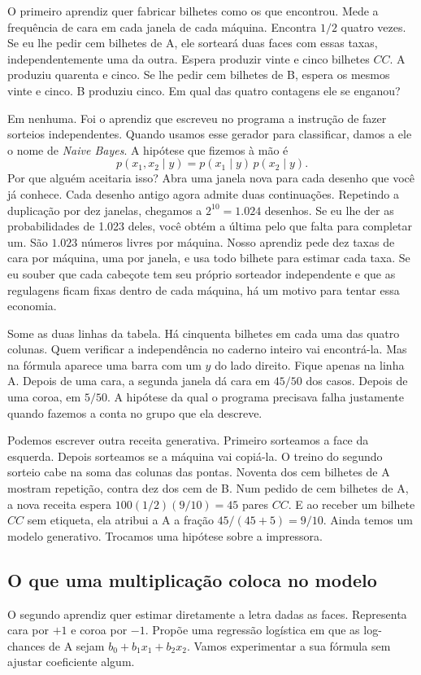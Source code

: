 \documentclass[12pt,oneside]{article}
\newcommand{\secao}[1]{\Needspace{5.2\baselineskip}\subsection*{#1}}
\newcommand{\bookanchor}[1]{\phantomsection\label{#1}}
\begin{document}
O primeiro aprendiz quer fabricar bilhetes como os que encontrou. Mede a frequência de cara em cada janela de cada máquina. Encontra $1/2$ quatro vezes. Se eu lhe pedir cem bilhetes de A, ele sorteará duas faces com essas taxas, independentemente uma da outra. Espera produzir vinte e cinco bilhetes $CC$. A produziu quarenta e cinco. Se lhe pedir cem bilhetes de B, espera os mesmos vinte e cinco. B produziu cinco. Em qual das quatro contagens ele se enganou?

Em\bookanchor{topic-05-1} nenhuma. Foi o aprendiz que escreveu no programa a instrução de fazer sorteios independentes. Quando usamos esse gerador para classificar, damos a ele o nome de \emph{Naive Bayes}. A hipótese que fizemos à mão é
\[
     p(x_1,x_2\mid y)=p(x_1\mid y)\,p(x_2\mid y).
\]
Por que alguém aceitaria isso? Abra uma janela nova para cada desenho que você já conhece. Cada desenho antigo agora admite duas continuações. Repetindo a duplicação por dez janelas, chegamos a $2^{10}=1.024$ desenhos. Se eu lhe der as probabilidades de 1.023 deles, você obtém a última pelo que falta para completar um. São $1.023$ números livres por máquina. Nosso aprendiz pede dez taxas de cara por máquina, uma por janela, e usa todo bilhete para estimar cada taxa. Se eu souber que cada cabeçote tem seu próprio sorteador independente e que as regulagens ficam fixas dentro de cada máquina, há um motivo para tentar essa economia.

Some as duas linhas da tabela. Há cinquenta bilhetes em cada uma das quatro colunas. Quem verificar a independência no caderno inteiro vai encontrá-la. Mas na fórmula aparece uma barra com um $y$ do lado direito. Fique apenas na linha A. Depois de uma cara, a segunda janela dá cara em $45/50$ dos casos. Depois de uma coroa, em $5/50$. A hipótese da qual o programa precisava falha justamente quando fazemos a conta no grupo que ela descreve.

Podemos escrever outra receita generativa. Primeiro sorteamos a face da esquerda. Depois sorteamos se a máquina vai copiá-la. O treino do segundo sorteio cabe na soma das colunas das pontas. Noventa dos cem bilhetes de A mostram repetição, contra dez dos cem de B. Num pedido de cem bilhetes de A, a nova receita espera $100(1/2)(9/10)=45$ pares $CC$. E ao receber um bilhete $CC$ sem etiqueta, ela atribui a A a fração $45/(45+5)=9/10$. Ainda temos um modelo generativo. Trocamos uma hipótese sobre a impressora.

\secao{O que uma multiplicação coloca no modelo}
O segundo aprendiz quer estimar diretamente a letra dadas as faces. Representa cara por $+1$ e coroa por $-1$. Propõe uma regressão logística em que as log-chances de A sejam $b_0+b_1x_1+b_2x_2$. Vamos experimentar a sua fórmula sem ajustar coeficiente algum.
\end{document}
